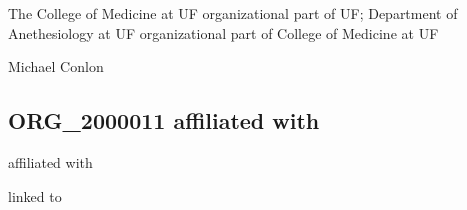 \documentclass[letterpaper,10pt,english]{sphinxmanual}
\begin{document}
\begin{sphinxShadowBox}

\sphinxAtStartPar
{\hyperref[\detokenize{doc-ORG_0000005::doc}]{}}
\end{sphinxShadowBox}

\begin{sphinxShadowBox}

\sphinxAtStartPar
{\hyperref[\detokenize{doc-ORG_0000001::doc}]{}}
\end{sphinxShadowBox}

\begin{sphinxShadowBox}

\sphinxAtStartPar
The College of Medicine at UF organizational part of UF; Department of Anethesiology at UF organizational part of College of Medicine at UF
\end{sphinxShadowBox}

\begin{sphinxShadowBox}

\sphinxAtStartPar
Michael Conlon 
\end{sphinxShadowBox}
\begin{quote}

\ignorespaces \end{quote}


\subsection{ORG\_2000011 \sphinxhyphen{} affiliated with}
\label{\detokenize{doc-ORG_2000011:org-2000011-affiliated-with}}\label{\detokenize{doc-ORG_2000011:index-0}}\label{\detokenize{doc-ORG_2000011::doc}}
\begin{sphinxShadowBox}

\sphinxAtStartPar
affiliated with
\end{sphinxShadowBox}

\begin{sphinxShadowBox}

\sphinxAtStartPar
linked to
\end{sphinxShadowBox}
\end{document}
